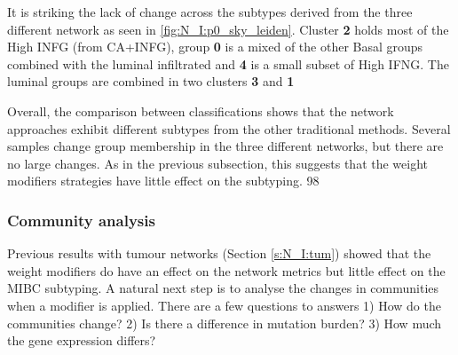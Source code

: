 {It is striking the lack of change across the subtypes derived from the three different network as seen in \cref{fig:N_I:p0_sky_leiden}. Cluster \textbf{2} holds most of the High INFG (from CA+INFG), group \textbf{0} is a mixed of the other Basal groups combined with the luminal infiltrated and \textbf{4} is a small subset of High IFNG. The luminal groups are combined in two clusters \textbf{3} and \textbf{1}



Overall, the comparison between classifications shows that the network approaches exhibit different subtypes from the other traditional methods. Several samples change group membership in the three different networks, but there are no large changes. As in the previous subsection, this suggests that the weight modifiers strategies have little effect on the subtyping. 98

\subsubsection{Community analysis}

Previous results with tumour networks (Section \ref{s:N_I:tum}) showed that the weight modifiers do have an effect on the network metrics but little effect on the MIBC subtyping. A natural next step is to analyse the changes in communities when a modifier is applied. There are a few questions to answers 1) How do the communities change? 2) Is there a difference in mutation burden? 3) How much the gene expression differs? 

}
